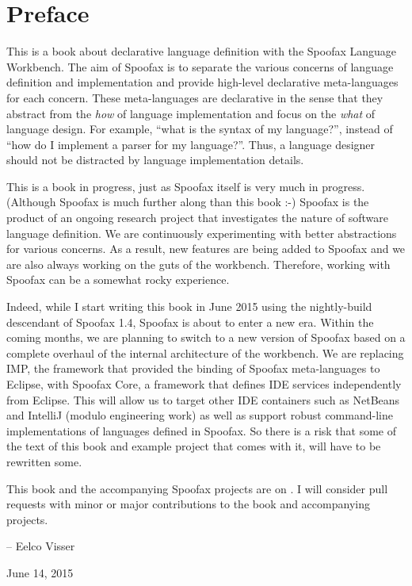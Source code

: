 \chapter*{Preface}

This is a book about declarative language definition with the Spoofax Language
Workbench.
The aim of Spoofax is to separate the various concerns of language definition
and implementation and provide high-level declarative meta-languages for each
concern.
These meta-languages are declarative in the sense that they abstract from the
\emph{how} of language implementation and focus on the \emph{what} of language
design.
For example, ``what is the syntax of my language?'', instead of ``how do I
implement a parser for my language?''.
Thus, a language designer should not be distracted by language implementation
details. 

This is a book in progress, just as Spoofax itself is very much in progress.
(Although Spoofax is much further along than this book :-) Spoofax is the
product of an ongoing research project that investigates the nature of software
language definition. We are continuously experimenting with better abstractions
for various concerns.
As a result, new features are being added to Spoofax and we are also always
working on the guts of the workbench.
Therefore, working with Spoofax can be a somewhat rocky experience.

Indeed, while I start writing this book in June 2015 using the nightly-build
descendant of Spoofax 1.4, Spoofax is about to enter a new era.
Within the coming months, we are planning to switch to a new version of Spoofax
based on a complete overhaul of the internal architecture of the workbench.
We are replacing IMP, the framework that provided the binding of Spoofax
meta-languages to Eclipse, with Spoofax Core, a framework that defines IDE
services independently from Eclipse. This will allow us to target other IDE
containers such as NetBeans and IntelliJ (modulo engineering work) as well as
support robust command-line implementations of languages defined in Spoofax. So
there is a risk that some of the text of this book and example project that
comes with it, will have to be rewritten some.

This book and the accompanying Spoofax projects are on . 
I will consider pull requests with minor or major contributions to the book
and accompanying projects.

-- Eelco Visser

June 14, 2015


